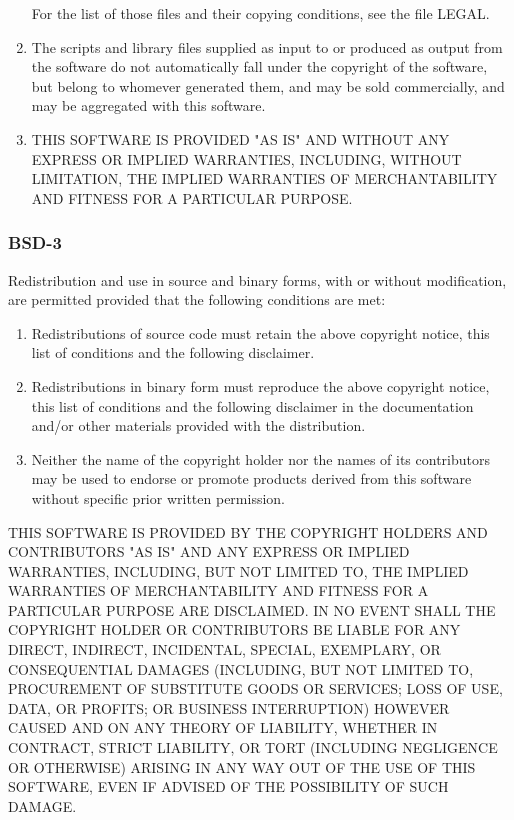 \documentclass[11pt,a4paper, twoside]{article}
\begin{document}
\begin{enumerate}
     For the list of those files and their copying conditions, see the
     file LEGAL.
\item The scripts and library files supplied as input to or produced as 
     output from the software do not automatically fall under the
     copyright of the software, but belong to whomever generated them, 
     and may be sold commercially, and may be aggregated with this
     software.
\item THIS SOFTWARE IS PROVIDED "AS IS" AND WITHOUT ANY EXPRESS OR
     IMPLIED WARRANTIES, INCLUDING, WITHOUT LIMITATION, THE IMPLIED
     WARRANTIES OF MERCHANTABILITY AND FITNESS FOR A PARTICULAR
     PURPOSE.
\end{enumerate}
\subsubsection{BSD-3}
Redistribution and use in source and binary forms, with or without modification, are permitted provided that the following conditions are met:
\begin{enumerate}

\item Redistributions of source code must retain the above copyright notice, this list of conditions and the following disclaimer.

\item Redistributions in binary form must reproduce the above copyright notice, this list of conditions and the following disclaimer in the documentation and/or other materials provided with the distribution.

\item Neither the name of the copyright holder nor the names of its contributors may be used to endorse or promote products derived from this software without specific prior written permission.

\end{enumerate}
THIS SOFTWARE IS PROVIDED BY THE COPYRIGHT HOLDERS AND CONTRIBUTORS "AS IS" AND ANY EXPRESS OR IMPLIED WARRANTIES, INCLUDING, BUT NOT LIMITED TO, THE IMPLIED WARRANTIES OF MERCHANTABILITY AND FITNESS FOR A PARTICULAR PURPOSE ARE DISCLAIMED. IN NO EVENT SHALL THE COPYRIGHT HOLDER OR CONTRIBUTORS BE LIABLE FOR ANY DIRECT, INDIRECT, INCIDENTAL, SPECIAL, EXEMPLARY, OR CONSEQUENTIAL DAMAGES (INCLUDING, BUT NOT LIMITED TO, PROCUREMENT OF SUBSTITUTE GOODS OR SERVICES; LOSS OF USE, DATA, OR PROFITS; OR BUSINESS INTERRUPTION) HOWEVER CAUSED AND ON ANY THEORY OF LIABILITY, WHETHER IN CONTRACT, STRICT LIABILITY, OR TORT (INCLUDING NEGLIGENCE OR OTHERWISE) ARISING IN ANY WAY OUT OF THE USE OF THIS SOFTWARE, EVEN IF ADVISED OF THE POSSIBILITY OF SUCH DAMAGE.
\newpage
\end{document}
